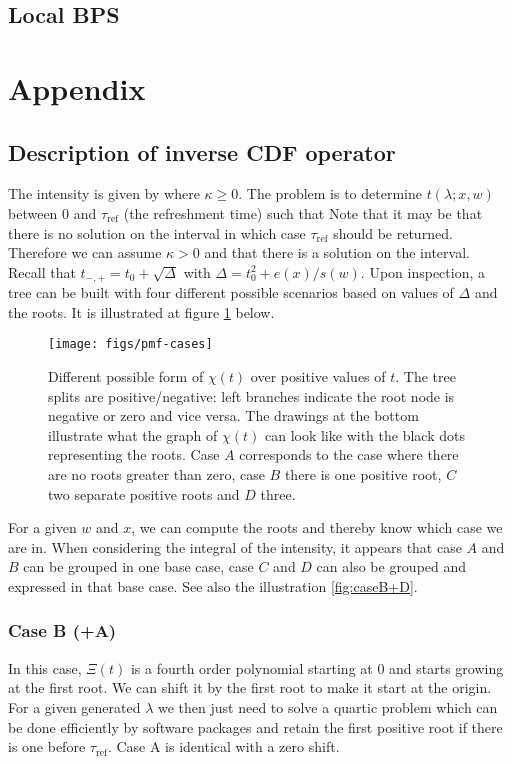 \subsection{Local BPS}


\appendix
\section{Appendix}
\subsection{\label{ref:inverseop1}Description of inverse CDF operator}
The intensity is given by
%
%
where $\kappa\ge0$. The problem is to determine $t(\lambda; x,w)$ between $0$ and $\tau_{\text{ref}}$ (the refreshment time) such that
%
Note that it may be that there is no solution on the interval in which case $\tau_{\text{ref}}$ should be returned. Therefore we can assume $\kappa>0$ and that there is a solution on the interval. Recall that $t_{-,+}=t_{0}+\sqrt{\Delta}$ with $\Delta = t_{0}^{2}+e(x)/s(w)$. Upon inspection, a tree can be built with four different possible scenarios based on values of $\Delta$ and the roots. It is illustrated at figure \ref{fig:pmf-cases} below. 

\begin{figure}[!h]
\center
	\texttt{[image: figs/pmf-cases]}
	\caption{\label{fig:pmf-cases}Different possible form of $\chi(t)$ over positive values of $t$. The tree splits are positive/negative: left branches indicate the root node is negative or zero and vice versa. The drawings at the bottom illustrate what the graph of $\chi(t)$ can look like with the black dots representing the roots. Case $A$ corresponds to the case where there are no roots greater than zero, case $B$ there is one positive root, $C$ two separate positive roots and $D$ three.}
\end{figure}

For a given $w$ and $x$, we can compute the roots and thereby know which case we are in. When considering the integral of the intensity, it appears that case $A$ and $B$ can be grouped in one base case, case $C$ and $D$ can also be grouped and expressed in that base case. See also the illustration \ref{fig:caseB+D}.

\subsubsection*{Case B (+A)}
In this case, $\Xi(t)$ is a fourth order polynomial starting at 0 and starts growing at the first root. We can shift it by the first root to make it start at the origin. For a given generated $\lambda$ we then just need to solve a quartic problem which can be done efficiently by software packages and retain the first positive root if there is one before $\tau_{\text{ref}}$. Case A is identical with a zero shift.

